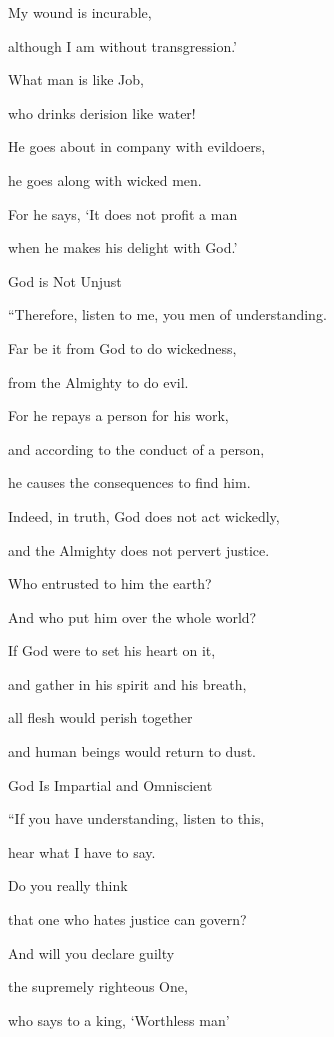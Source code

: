 {\par }{\Q My wound
is incurable,
\par }{\Q although I am without
transgression.’
\par }{\Q {}What
man
is like Job,
\par }{\Q who drinks
derision
like water!
\par }{\Q {}He goes about
in company
with
evildoers,
\par }{\Q he goes along
with
wicked
men.
\par }{\Q {}For
he says,
‘It does not
profit
a man
\par }{\Q when he makes his delight
with
God.’
\par }{\SH God is Not Unjust
\par }{\Q {}“Therefore,
listen
to me, you men
of understanding.
\par }{\Q Far be it
from God
to do wickedness,
\par }{\Q from the Almighty
to do evil.
\par }{\Q {}For
he repays
a person
for his work,
\par }{\Q and according to the conduct of a person,
\par }{\Q he causes the consequences
to find him.
\par }{\Q {}Indeed,
in truth,
God
does not
act wickedly,
\par }{\Q and the Almighty
does not
pervert
justice.
\par }{\Q {}Who
entrusted
to him
the earth?
\par }{\Q And who
put
him over the whole
world?
\par }{\Q {}If
God were to
set
his heart
on it,

\par }{\Q and gather
in
his spirit
and his breath,
\par }{\Q {}all
flesh
would perish
together
\par }{\Q and human
beings would return
to dust.
\par }{\SH God Is Impartial and Omniscient
\par }{\Q {}“If
you have understanding,
listen
to this,
\par }{\Q hear
what
I have to say.
\par }{\Q {}Do
you really
think

\par }{\Q that one who hates
justice
can govern?

\par }{\Q And will you declare guilty
\par }{\Q the supremely
righteous One,
\par }{\Q {}who says
to a king, ‘Worthless
man’

}

